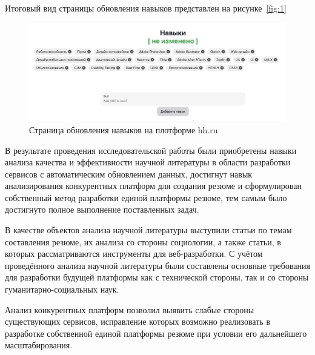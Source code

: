 \documentclass[master, och, pract]{SCWorks}
\begin{document}
Итоговый вид страницы обновления навыков представлен на рисунке~\ref{fig:1} 
\begin{figure}[!ht]
    \centering
    \includegraphics[width=12cm]{images/image-update-skills.png}
    \caption{\label{fig:6}%
        Страница обновления навыков на плотформе hh.ru}
\end{figure}







\newpage
\conclusion
В результате проведения исследовательской работы были приобретены навыки анализа 
качества и эффективности научной литературы в области разработки сервисов 
с автоматическим обновлением данных, достигнут навык анализирования конкурентных 
платформ для создания резюме и сформулирован собственный метод разработки 
единой платформы резюме, тем самым было достигнуто полное выполнение поставленных задач.

В качестве объектов анализа научной литературы выступили статьи по темам составления 
резюме, их анализа со стороны социологии, а также статьи, в которых рассматриваются 
инструменты для веб-разработки. С учётом проведённого анализа научной литературы 
были составлены основные требования для разработки будущей платформы как с технической 
стороны, так и со стороны гуманитарно-социальных наук.

Анализ конкурентных платформ позволил выявить слабые стороны существующих сервисов, 
исправление которых возможно реализовать в разработке собственной единой платформы 
резюме при условии его дальнейшего масштабирования. \cite{Arhipov_2015}




%

\end{document}
